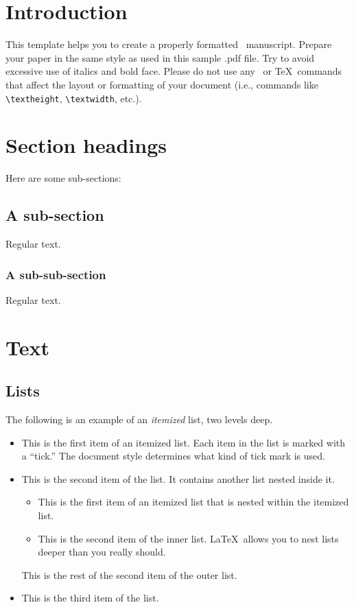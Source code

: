 \documentclass[aap]{imsart}
\theoremstyle{plain}
\theoremstyle{definition}
\begin{document}
\section{Introduction}

This template helps you to create a properly formatted \LaTeXe\ manuscript.
Prepare your paper in the same style as used in this sample .pdf file.
Try to avoid excessive use of italics and bold face.
Please do not use any \LaTeXe\ or \TeX\ commands that affect the layout
or formatting of your document (i.e., commands like \verb|\textheight|,
\verb|\textwidth|, etc.).

\section{Section headings}
Here are some sub-sections:
\subsection{A sub-section}
Regular text.
\subsubsection{A sub-sub-section}
Regular text.

\section{Text}
\subsection{Lists}

The following is an example of an \emph{itemized} list,
two levels deep.
\begin{itemize}
\item
This is the first item of an itemized list.  Each item
in the list is marked with a ``tick.''  The document
style determines what kind of tick mark is used.
\item
This is the second item of the list.  It contains another
list nested inside it.
\begin{itemize}
\item This is the first item of an itemized list that
is nested within the itemized list.
\item This is the second item of the inner list.  \LaTeX\
allows you to nest lists deeper than you really should.
\end{itemize}
This is the rest of the second item of the outer list.
\item
This is the third item of the list.
\end{itemize}
\end{document}
